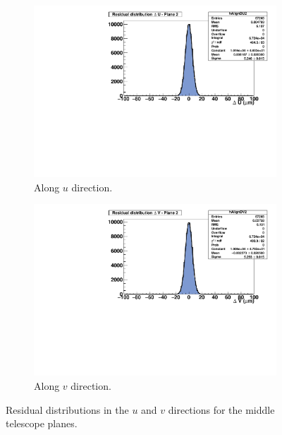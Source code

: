       \begin{figure}
        \centering
        \begin{subfigure}[t]{0.45\textwidth}
          \centering
          \includegraphics[width = 1.2\textwidth]{Pictures/deformation/residualUPl2_226056.pdf}
          \caption{Along $u$ direction.}
          \label{fig:alignmentPlane2}
        \end{subfigure}
        \hfill
        \begin{subfigure}[t]{0.45\textwidth}
          \centering
          \includegraphics[width = 1.2\textwidth]{Pictures/deformation/residualVPl2_226056.pdf}
          \caption{Along $v$ direction.}
          \label{fig:alignmentPlane3}
        \end{subfigure}
        \caption{Residual distributions in the $u$ and $v$ directions for the middle telescope planes.}
        \label{fig:alignmentTelescope}
      \end{figure}

